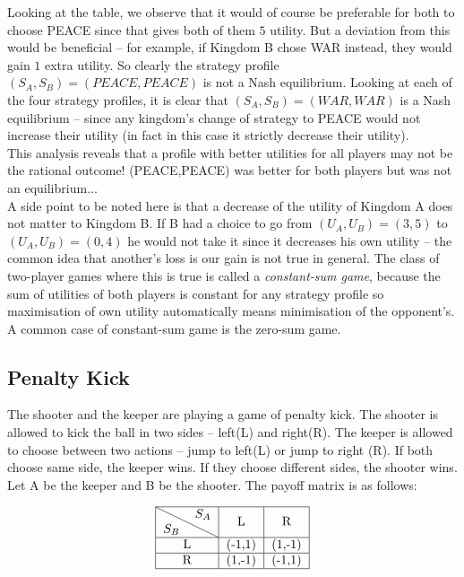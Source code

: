 \noindent Looking at the table, we observe that it would of course be preferable for both to 
choose PEACE since that gives both of them $5$ utility. But a deviation from this would be 
beneficial -- for example, if Kingdom B chose WAR instead, they would gain $1$ extra utility. So 
clearly the strategy profile $(S_A,S_B)=(PEACE,PEACE)$ is not a Nash equilibrium. Looking 
at each of the four strategy profiles, it is clear that $(S_A,S_B)=(WAR,WAR)$ is a Nash equilibrium -- 
since any kingdom's change of strategy to PEACE would not increase their utility 
(in fact in this case it strictly decrease their utility). \\

\noindent This analysis reveals that a profile with better utilities for all players 
may not be the rational outcome! (PEACE,PEACE) was better for both players but was not an 
equilibrium$\dots$\\

\noindent A side point to be noted here is that a decrease of the utility of Kingdom A does not matter 
to Kingdom B. If B had a choice to go from $(U_A,U_B)=(3,5)$ to $(U_A,U_B)=(0,4)$ he would not 
take it since it decreases his own utility -- the common idea that another's loss is our gain 
is not true in general. The class of two-player games where this is true is called a \emph{constant-sum game}, 
because the sum of utilities of both players is constant for any strategy profile 
so maximisation of own utility automatically means minimisation of the opponent's. A common case of 
constant-sum game is the zero-sum game.

\subsection{Penalty Kick}
The shooter and the keeper are playing a game of penalty kick. The shooter is allowed to kick 
the ball in two sides -- left(L) and right(R). The keeper is allowed to choose between two actions -- jump 
to left(L) or jump to right (R). If both choose same side, the keeper wins. If they choose different 
sides, the shooter wins.\\

\noindent Let A be the keeper and B be the shooter. The payoff matrix is as follows:

\[
\begin{tabular}{|c|c|c|}
\hline
\diagbox {$S_B$}{$S_A$} & \text{L} & \text{R} \\
\hline
\text{L} & (-1,1) & (1,-1) \\
\hline
\text{R} & (1,-1) & (-1,1) \\
\hline
\end{tabular}
\]


